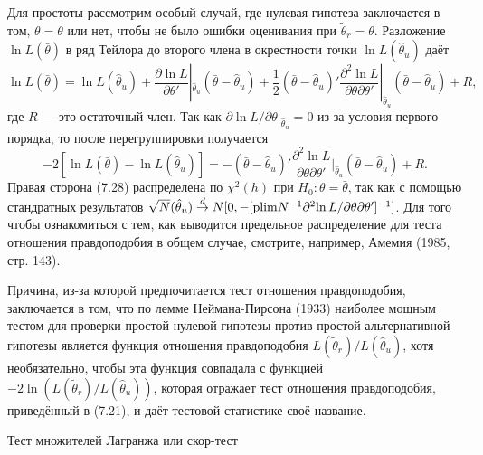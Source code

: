 Для простоты рассмотрим особый случай, где нулевая гипотеза заключается в том, $\theta = \bar{\theta}$ или нет, чтобы не было ошибки оценивания при $\tilde{\theta}_r = \bar{\theta}$. Разложение $\ln L(\bar{\theta})$ в ряд Тейлора до второго члена в окрестности точки $\ln L(\hat{\theta}_u)$ даёт
\[
\ln L(\bar{\theta}) = \ln L(\hat{\theta}_u) + \frac{\partial{\ln L}}{\partial{\theta}'}|_{\hat{\theta}_u}(\bar{\theta} - \hat{\theta}_u) + \frac{1}{2}(\bar{\theta} - \hat{\theta}_u)'\frac{\partial^2{\ln L}}{\partial{\theta}\partial{\theta}'}|_{\hat{\theta}_u}(\bar{\theta} - \hat{\theta}_u) + R,
\]
где $R$ --- это остаточный член. Так как $\partial{\ln L}/\partial{\theta}|_{\hat{\theta}_u} = 0$ из-за условия первого порядка, то после перегруппировки получается
\begin{equation}
-2[\ln L(\bar{\theta}) - \ln L(\hat{\theta}_u)] = - (\bar{\theta} - \hat{\theta}_u)'\frac{\partial^2{\ln L}}{\partial{\theta}\partial{\theta}'}|_{\hat{\theta}_u}(\bar{\theta} - \hat{\theta}_u) + R.
\end{equation}
Правая сторона (7.28) распределена по $\chi^2(h)$ при $H_0: \theta = \bar{\theta}$, так как с помощью стандратных результатов $\sqrt{N}(\hat{\theta}_u) \stackrel{d}{\rightarrow} N[0, -[\mathrm{plim } N^{-1}\partial^2{\ln L}/
\partial{\theta}\partial{\theta}']^{-1}]$. Для того чтобы ознакомиться с тем, как выводится предельное распределение для теста отношения правдоподобия в общем случае, смотрите, например, Амемия (1985, стр. 143).

Причина, из-за которой предпочитается тест отношения правдоподобия, заключается в том, что по лемме Неймана-Пирсона (1933) наиболее мощным тестом для проверки простой нулевой гипотезы против простой альтернативной гипотезы является функция отношения правдоподобия $L(\tilde{\theta}_r)/L(\hat{\theta}_u)$, хотя необязательно, чтобы эта функция совпадала с функцией $-2\ln(L(\tilde{\theta}_r)/L(\hat{\theta}_u))$, которая отражает тест отношения правдоподобия, приведённый в (7.21), и даёт тестовой статистике своё название.

\begin{center}
Тест множителей Лагранжа или скор-тест
\end{center}

